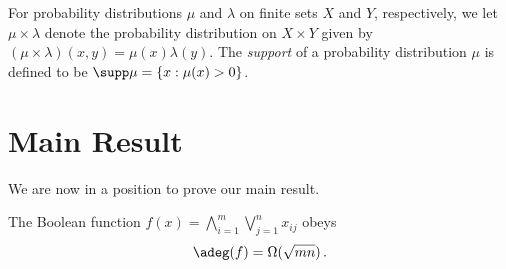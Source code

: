 For probability distributions $\mu$ and $\lambda$ on finite sets
$X$ and $Y$, respectively, we let $\mu\times\lambda$ denote the
probability distribution on $X\times Y$ given by 
$(\mu\times\lambda)(x,y)=\mu(x)\lambda(y)$.
The \emph{support }of a probability distribution $\mu$ is defined
to be $\supp\mu=\{x:\mu(x)>0\}$.
 
 
\section{Main Result}
 
We are now in a position to prove our main result.

%
%
\begin{theorem}
The Boolean function $f(x)=\bigwedge_{i=1}^m\bigvee_{j=1}^nx_{ij}$
obeys
\begin{align}
\adeg(f)=\Omega(\sqrt{mn})\,.\label{eq:f-adeg-main-equation}
\end{align}
%
\end{theorem}

